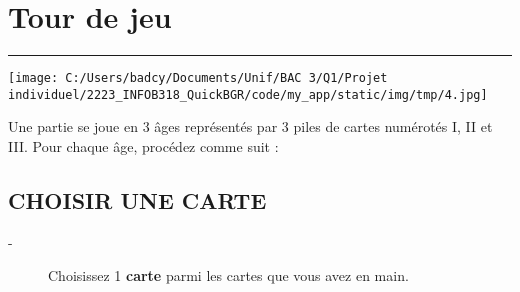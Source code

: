 \documentclass{scrartcl}%
\begin{document}
%
\section{ Tour de jeu
}%
\label{sec:Tourdejeu}%
\rule{18cm}{0.07cm}\break%
%
\begin{center}\texttt{[image: C:/Users/badcy/Documents/Unif/BAC 3/Q1/Projet individuel/2223\_INFOB318\_QuickBGR/code/my\_app/static/img/tmp/4.jpg]}\end{center}%

%

%
Une partie se joue en 3 âges représentés par 3 piles de cartes numérotés I, II et III. Pour chaque âge, procédez comme suit :


%
\subsection{ CHOISIR UNE CARTE
}%
\label{subsec:CHOISIRUNECARTE}%
\begin{description}%
\item[{-} ]%
%
 Choisissez 1 %
\textbf{carte}%
\textit{ }%
 parmi les cartes que vous avez en main.
%
\end{description}

%
\end{document}
